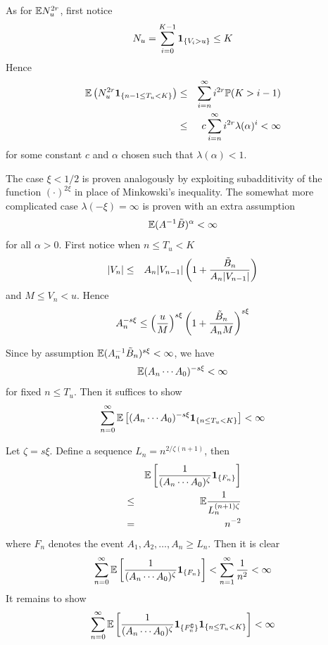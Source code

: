\documentclass{beamer}
\begin{document}
\begin{frame}
  As for $\mathbb{E} N_u^{2r}$, first notice
  \[
  N_u = \sum_{i=0}^{K-1} \mathbf{1}_{\{V_i > u\}} \leq K
  \]
  Hence
  \begin{eqnarray*}
    \mathbb{E} \left(N_u^{2r}\mathbf{1}_{\{n-1 \leq T_u < K\}}\right) &\leq& \sum_{i=n}^\infty i^{2r}
    \mathbb{P}(K > i-1) \\
    &\leq& c \sum_{i=n}^\infty i^{2r} \lambda(\alpha)^i < \infty
  \end{eqnarray*}
  for some constant $c$ and $\alpha$ chosen such that $\lambda(\alpha)
  < 1$.
\end{frame}

\begin{frame}
  The case $\xi < 1/2$ is proven analogously by exploiting
  subadditivity of the function $(\cdot)^{2\xi}$ in place of
  Minkowski's inequality. The somewhat more complicated case
  $\lambda(-\xi) = \infty$ is proven with an extra assumption
  \[
  \mathbb{E} (A^{-1} \tilde B)^\alpha < \infty
  \]
  for all $\alpha > 0$. First notice when $n \leq T_u < K$
  \begin{eqnarray*}
    |V_n| &\leq& A_n |V_{n-1}| \left(
      1 + {
        \tilde B_n
        \over
        A_n |V_{n-1}|
      }
    \right)
  \end{eqnarray*}
  and $M \leq V_n < u$. Hence
  \[
  A_n^{-s\xi} \leq \left(
    {
      u \over M
    }
    \right)^{s\xi} 
    \left(
    1 + {
      \tilde B_n
      \over
      A_n M
    }
  \right)^{s\xi}
  \]
\end{frame}

\begin{frame}
  Since by assumption $\mathbb{E} (A_n^{-1} \tilde B_n)^{s\xi} < \infty$, we
  have
  \[
  \mathbb{E} (A_{n} \cdots A_0)^{-s\xi} < \infty
  \]
  for fixed $n \leq T_u$. Then it suffices to show
  \[
  \sum_{n=0}^\infty
    \mathbb{E} \left[
      (A_n \cdots A_0)^{-s\xi} \mathbf{1}_{\{n \leq T_u < K\}}
    \right] < \infty
  \]
\end{frame}

\begin{frame}
  Let $\zeta = s \xi$. Define a sequence $L_n = n^{2/\zeta(n+1)}$,
  then
  \begin{eqnarray*}
    && \mathbb{E} \left[
      {
        1 \over
        (A_n \cdots A_0)^\zeta
      }  \mathbf{1}_{\{F_n\}}\right] \\
    &\leq& \mathbb{E} {
      1
      \over
      L_n^{(n+1)\zeta}
    } \\
    &=& n^{-2}
  \end{eqnarray*}
  where $F_n$ denotes the event $A_1, A_2, \dots, A_{n} \geq
  L_n$. Then it is clear
  \[
  \sum_{n=0}^\infty  \mathbb{E} \left[
    {
      1 \over
      (A_n \cdots A_0)^\zeta
    }  \mathbf{1}_{\{F_n\}} \right]
  <  \sum_{n=1}^\infty {1 \over n^2} < \infty
  \]
  It remains to show
  \[
  \sum_{n=0}^\infty  \mathbb{E} \left[
    {
      1 \over
      (A_n \cdots A_0)^\zeta
    }  \mathbf{1}_{\{F_n^\complement\}} \mathbf{1}_{\{n \leq T_u < K\}} \right] < \infty
  \]
\end{frame}
\end{document}
